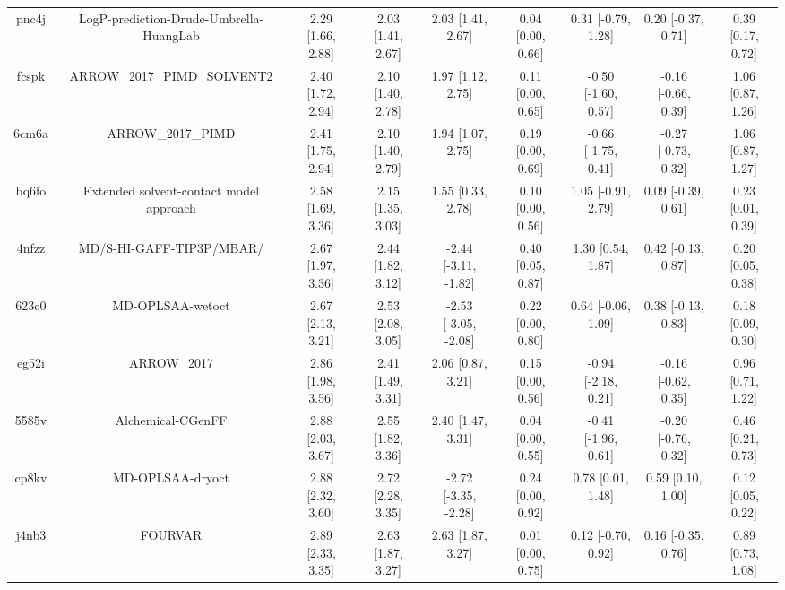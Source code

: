 \documentclass{article}
\begin{document}
\begin{center}
\begin{longtable}{|ccccccccc|}
 pnc4j &            LogP-prediction-Drude-Umbrella-HuangLab &  2.29 [1.66, 2.88] &  2.03 [1.41, 2.67] &     2.03 [1.41, 2.67] &  0.04 [0.00, 0.66] &   0.31 [-0.79, 1.28] &   0.20 [-0.37, 0.71] &     0.39 [0.17, 0.72] \\
 fcspk &                        ARROW\_2017\_PIMD\_SOLVENT2 &  2.40 [1.72, 2.94] &  2.10 [1.40, 2.78] &     1.97 [1.12, 2.75] &  0.11 [0.00, 0.65] &  -0.50 [-1.60, 0.57] &  -0.16 [-0.66, 0.39] &     1.06 [0.87, 1.26] \\
 6cm6a &                                  ARROW\_2017\_PIMD &  2.41 [1.75, 2.94] &  2.10 [1.40, 2.79] &     1.94 [1.07, 2.75] &  0.19 [0.00, 0.69] &  -0.66 [-1.75, 0.41] &  -0.27 [-0.73, 0.32] &     1.06 [0.87, 1.27] \\
 bq6fo &            Extended solvent-contact model approach &  2.58 [1.69, 3.36] &  2.15 [1.35, 3.03] &     1.55 [0.33, 2.78] &  0.10 [0.00, 0.56] &   1.05 [-0.91, 2.79] &   0.09 [-0.39, 0.61] &     0.23 [0.01, 0.39] \\
 4nfzz &                           MD/S-HI-GAFF-TIP3P/MBAR/ &  2.67 [1.97, 3.36] &  2.44 [1.82, 3.12] &  -2.44 [-3.11, -1.82] &  0.40 [0.05, 0.87] &    1.30 [0.54, 1.87] &   0.42 [-0.13, 0.87] &     0.20 [0.05, 0.38] \\
 623c0 &                                   MD-OPLSAA-wetoct &  2.67 [2.13, 3.21] &  2.53 [2.08, 3.05] &  -2.53 [-3.05, -2.08] &  0.22 [0.00, 0.80] &   0.64 [-0.06, 1.09] &   0.38 [-0.13, 0.83] &     0.18 [0.09, 0.30] \\
 eg52i &                                        ARROW\_2017 &  2.86 [1.98, 3.56] &  2.41 [1.49, 3.31] &     2.06 [0.87, 3.21] &  0.15 [0.00, 0.56] &  -0.94 [-2.18, 0.21] &  -0.16 [-0.62, 0.35] &     0.96 [0.71, 1.22] \\
 5585v &                                  Alchemical-CGenFF &  2.88 [2.03, 3.67] &  2.55 [1.82, 3.36] &     2.40 [1.47, 3.31] &  0.04 [0.00, 0.55] &  -0.41 [-1.96, 0.61] &  -0.20 [-0.76, 0.32] &     0.46 [0.21, 0.73] \\
 cp8kv &                                   MD-OPLSAA-dryoct &  2.88 [2.32, 3.60] &  2.72 [2.28, 3.35] &  -2.72 [-3.35, -2.28] &  0.24 [0.00, 0.92] &    0.78 [0.01, 1.48] &    0.59 [0.10, 1.00] &     0.12 [0.05, 0.22] \\
 j4nb3 &                                            FOURVAR &  2.89 [2.33, 3.35] &  2.63 [1.87, 3.27] &     2.63 [1.87, 3.27] &  0.01 [0.00, 0.75] &   0.12 [-0.70, 0.92] &   0.16 [-0.35, 0.76] &     0.89 [0.73, 1.08] \\

\end{longtable}
\end{center}
\end{document}

